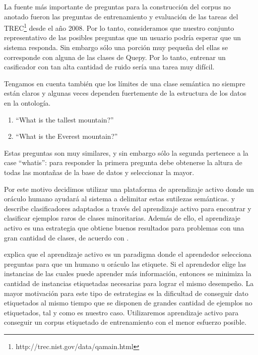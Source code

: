 La fuente más importante de preguntas para la construcción del corpus no anotado fueron las preguntas de entrenamiento y evaluación de las tareas del TREC\footnote{http://trec.nist.gov/data/qamain.html} desde el año 2008. Por lo tanto, consideramos que nuestro conjunto representativo de las posibles preguntas que un usuario podría esperar que un sistema responda. Sin embargo sólo una porción muy pequeña del ellas se corresponde con alguna de las clases de Quepy. Por lo tanto, entrenar un casificador con tan alta cantidad de ruido sería una tarea muy difícil.

Tengamos en cuenta también que los límites de una clase semántica no siempre están claros y algunas veces dependen fuertemente de la estructura de los datos en la ontología.

\begin{example}\label{preguntas-similares}\hfill
    \begin{enumerate}
    \item ``What is the tallest mountain?''
    \item ``What is the Everest mountain?''
    \end{enumerate}
\end{example}

Estas preguntas son muy similares, y sin embargo sólo la segunda pertenece a la case ``whatis'': para responder la primera pregunta debe obtenerse la altura de todas las montañas de la base de datos y seleccionar la mayor.

Por este motivo decidimos utilizar una plataforma de aprendizaje activo donde un oráculo humano ayudará al sistema a delimitar estas sutilezas semánticas. \citet{rare-classes-holpedales} y \citet{AL-imbalanced-Ertekin} describe clasificadores adaptados a través del aprendizaje activo para encontrar y clasificar ejemplos raros de clases minoritarias. Además de ello, el aprendizaje activo es una estrategia que obtiene buenos resultados para problemas con una gran cantidad de clases, de acuerdo con \citet{al-multiclass-jain}.

\citet{settles_active_learning_survey} explica que el aprendizaje activo es un paradigma donde el aprendedor selecciona preguntas para que un humano u oráculo las etiquete. Si el aprendedor elige las instancias de las cuales puede aprender más información, entonces se minimiza la cantidad de instancias etiquetadas necesarias para lograr el mismo desempeño. La mayor motivación para este tipo de estrategias es la dificultad de conseguir dato etiquetados al mismo tiempo que se disponen de grandes cantidad de ejemplos no etiquetados, tal y como es nuestro caso. Utilizaremos aprendizaje activo para conseguir un corpus etiquetado de entrenamiento con el menor esfuerzo posible.

